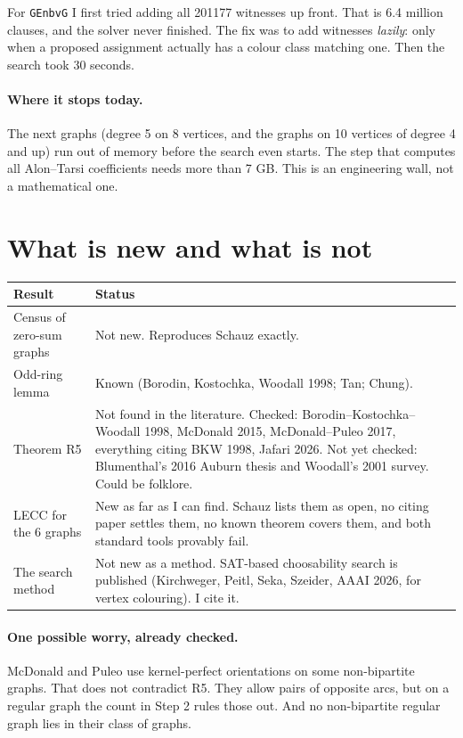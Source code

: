 \documentclass[11pt]{article}
\theoremstyle{plain}
\theoremstyle{definition}
\begin{document}
For \texttt{GEnbvG} I first tried adding all 201177 witnesses up front. That is 6.4 million
clauses, and the solver never finished. The fix was to add witnesses \emph{lazily}: only when a
proposed assignment actually has a colour class matching one. Then the search took 30 seconds.

\paragraph{Where it stops today.} The next graphs (degree 5 on 8 vertices, and the graphs on 10
vertices of degree 4 and up) run out of memory before the search even starts. The step that
computes all Alon--Tarsi coefficients needs more than 7 GB. This is an engineering wall, not a
mathematical one.

\section{What is new and what is not}

\begin{center}
\begin{tabular}{p{6.2cm}p{8cm}}
\toprule
Result & Status \\
\midrule
Census of zero-sum graphs & Not new. Reproduces Schauz exactly. \\
Odd-ring lemma & Known (Borodin, Kostochka, Woodall 1998; Tan; Chung). \\
Theorem R5 & Not found in the literature. Checked: Borodin--Kostochka--Woodall 1998, McDonald
2015, McDonald--Puleo 2017, everything citing BKW 1998, Jafari 2026. Not yet checked:
Blumenthal's 2016 Auburn thesis and Woodall's 2001 survey. Could be folklore. \\
LECC for the 6 graphs & New as far as I can find. Schauz lists them as open, no citing paper
settles them, no known theorem covers them, and both standard tools provably fail. \\
The search method & Not new as a method. SAT-based choosability search is published
(Kirchweger, Peitl, Seka, Szeider, AAAI 2026, for vertex colouring). I cite it. \\
\bottomrule
\end{tabular}
\end{center}

\paragraph{One possible worry, already checked.} McDonald and Puleo use kernel-perfect
orientations on some non-bipartite graphs. That does not contradict R5. They allow pairs of
opposite arcs, but on a regular graph the count in Step 2 rules those out. And no
non-bipartite regular graph lies in their class of graphs.
\end{document}
